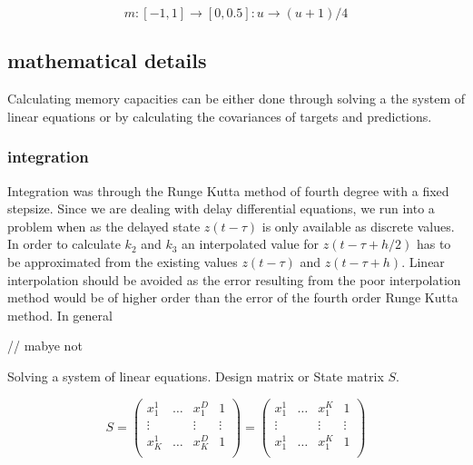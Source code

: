 \begin{equation}
	m: [-1,1] \rightarrow [0,0.5] : u \rightarrow (u + 1)/4
	\label{eq:mapping_u}
\end{equation}



\subsection{mathematical details}

Calculating memory capacities can be either done through solving a the system of linear equations or by calculating the covariances of targets and predictions. 

\subsubsection{integration}
Integration was through the Runge Kutta method of fourth degree with a fixed stepsize. Since we are dealing with delay differential equations, we run into a problem when as the delayed state $z(t-\tau)$ is only available as discrete values. In order to calculate $k_2$ and $k_3$ an interpolated value for $z(t-\tau+h/2)$ has to be approximated from the existing values $z(t-\tau)$ and $z(t-\tau+h)$. Linear interpolation should be avoided as the error resulting from the poor interpolation method would be of higher order than the error of the fourth order Runge Kutta method. In general  
\cite{FIL89}

\cite{NEV76} // mabye not

Solving a system of linear equations.
Design matrix or State matrix $S$.

\begin{figure}
	\begin{equation}
	S=\begin{pmatrix}
	x_{1}^{1} & \dots & x_{1}^{D} & 1 \\
	\vdots & & \vdots & \vdots \\
	x_{K}^{1} & \dots & x_{K}^{D} & 1 \\
	\end{pmatrix}
=
	\begin{pmatrix}
	x_{1}^{1} & \dots & x_{1}^{K} & 1 \\
	\vdots & & \vdots & \vdots \\
	x_{1}^{1} & \dots & x_{1}^{K} & 1 \\
	\end{pmatrix}
	\end{equation}
\end{figure}

